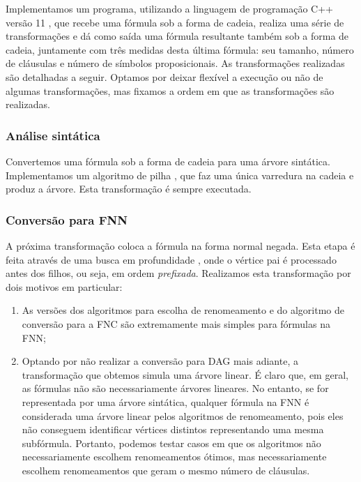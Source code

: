 Implementamos um programa, utilizando a linguagem de programação C++ versão 11 \cite{cpp11}, que recebe uma fórmula sob a forma de cadeia, realiza uma série de transformações e dá como saída uma fórmula resultante também sob a forma de cadeia, juntamente com três medidas desta última fórmula: seu tamanho, número de cláusulas e número de símbolos proposicionais. As transformações realizadas são detalhadas a seguir. Optamos por deixar flexível a execução ou não de algumas transformações, mas fixamos a ordem em que as transformações são realizadas.

\subsubsection{Análise sintática}

\indent

Convertemos uma fórmula sob a forma de cadeia para uma árvore sintática. Implementamos um algoritmo de pilha \cite{sipser2012introduction,CLRS09}, que faz uma única varredura na cadeia e produz a árvore. Esta transformação é sempre executada.

\subsubsection{Conversão para FNN}

\indent

A próxima transformação coloca a fórmula na forma normal negada. Esta etapa é feita através de uma busca em profundidade \cite{CLRS09}, onde o vértice pai é processado antes dos filhos, ou seja, em ordem \emph{prefixada}. Realizamos esta transformação por dois motivos em particular:
\begin{enumerate}
	\item As versões dos algoritmos para escolha de renomeamento e do algoritmo de conversão para a FNC são extremamente mais simples para fórmulas na FNN;
	\item Optando por não realizar a conversão para DAG mais adiante, a transformação que obtemos simula uma árvore linear. É claro que, em geral, as fórmulas não são necessariamente árvores lineares. No entanto, se for representada por uma árvore sintática, qualquer fórmula na FNN é considerada uma árvore linear pelos algoritmos de renomeamento, pois eles não conseguem identificar vértices distintos representando uma mesma subfórmula. Portanto, podemos testar casos em que os algoritmos não necessariamente escolhem renomeamentos ótimos, mas necessariamente escolhem renomeamentos que geram o mesmo número de cláusulas.
\end{enumerate}

